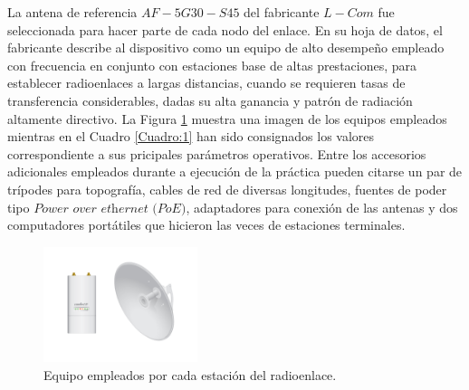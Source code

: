 \documentclass[conference]{IEEEtran}
\begin{document}
La antena de referencia $AF-5G30-S45$ del fabricante $L-Com$ fue seleccionada para hacer parte de cada nodo del enlace. En su hoja de datos, el fabricante
describe al dispositivo como un equipo de alto desempeño empleado con frecuencia en conjunto con estaciones base de altas prestaciones, para establecer 
radioenlaces a largas distancias, cuando se requieren tasas de transferencia considerables, dadas su alta ganancia y patrón de radiación altamente directivo. 
La Figura \ref{fig:Equipos} muestra una imagen de los equipos empleados mientras en el Cuadro \ref{Cuadro:1} han sido consignados los valores correspondiente a sus pricipales parámetros
operativos. Entre los accesorios adicionales empleados durante a ejecución de la práctica pueden citarse un par de trípodes para topografía, cables de red de
diversas longitudes, fuentes de poder tipo $\textit{Power over ethernet (PoE)}$, adaptadores para conexión de las antenas y dos computadores portátiles que hicieron 
las veces de estaciones terminales.  
\begin{figure}
    \centering
          \includegraphics[width=0.4\textwidth]{Equipos.png}
        \caption{Equipo empleados por cada estación del radioenlace.
        }
        \label{fig:Equipos}
\end{figure}
\end{document}

